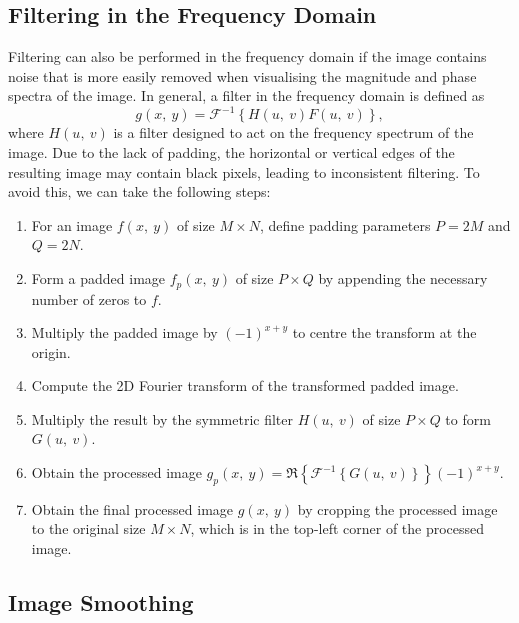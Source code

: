 \documentclass{article}
\begin{document}
\subsection{Filtering in the Frequency Domain}
Filtering can also be performed in the frequency domain if the image
contains noise that is more easily removed when visualising the
magnitude and phase spectra of the image. In general, a filter in the
frequency domain is defined as
\begin{equation*}
    g\left( x,\: y \right) = \mathscr{F}^{-1}\left\{ H\left( u,\: v \right) F\left( u,\: v \right) \right\},
\end{equation*}
where \(H\left( u,\: v \right)\) is a filter designed to act on the
frequency spectrum of the image. Due to the lack of padding, the
horizontal or vertical edges of the resulting image may contain black
pixels, leading to inconsistent filtering. To avoid this, we can take
the following steps:
\begin{enumerate}
    \item For an image \(f\left( x,\: y \right)\) of size \(M \times N\), define padding parameters
          \(P = 2M\) and \(Q = 2N\).
    \item Form a padded image \(f_p\left( x,\: y \right)\) of size \(P \times Q\)
          by appending the necessary number of zeros to \(f\).\
    \item Multiply the padded image by \(\left( -1 \right)^{x + y}\) to centre the
          transform at the origin.
    \item Compute the 2D Fourier transform of the transformed padded image.
    \item Multiply the result by the symmetric filter \(H\left( u,\: v \right)\) of size \(P \times Q\) to form \(G\left( u,\: v \right)\).
    \item Obtain the processed image \(g_p\left( x,\: y \right) = \Re\left\{ \mathscr{F}^{-1}\left\{ G\left( u,\: v \right) \right\} \right\} \left( -1 \right)^{x + y}\).
    \item Obtain the final processed image \(g\left( x,\: y \right)\) by
          cropping the processed image to the original size \(M \times N\),
          which is in the top-left corner of the processed image.
\end{enumerate}
\subsection{Image Smoothing}
\end{document}
